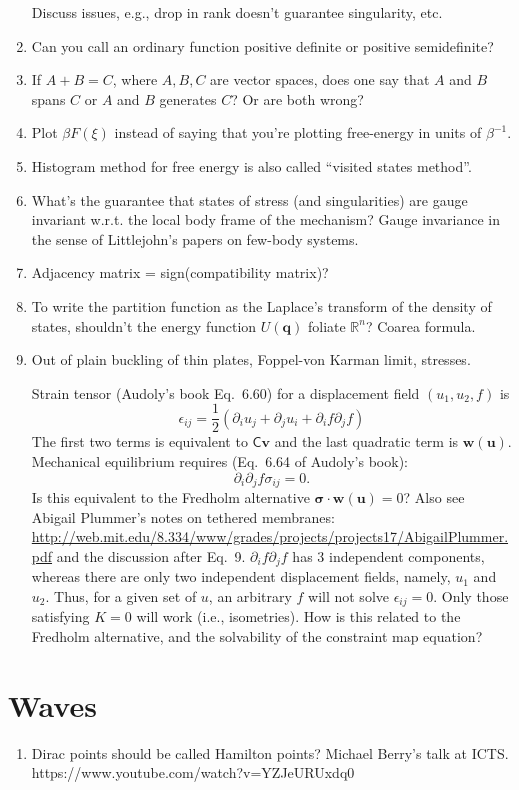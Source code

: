 \begin{enumerate}
  Discuss issues, e.g., drop in rank doesn't guarantee singularity, etc.
  \item Can you call an ordinary function positive definite or positive semidefinite?
  \item If $A + B = C$, where $A, B, C$ are vector spaces, does one say that $A$ and $B$ spans $C$ or $A$ and $B$ generates $C$?  Or are both wrong?
  \item Plot $\beta F(\xi)$ instead of saying that you're plotting free-energy in units of $\beta^{-1}$.
  \item Histogram method for free energy is also called ``visited states method''.
  \item What's the guarantee that states of stress (and singularities) are gauge invariant w.r.t. the local body frame of the mechanism?
    Gauge invariance in the sense of Littlejohn's papers on few-body systems.
  \item Adjacency matrix = sign(compatibility matrix)?
  \item To write the partition function as the Laplace's transform of the density of states, shouldn't the energy function $U(\bm{q})$ foliate $\mathbb{R}^{n}$? Coarea formula.

  \item Out of plain buckling of thin plates, Foppel-von Karman limit, stresses.

    Strain tensor (Audoly's book Eq.~6.60) for a displacement field $(u_{1}, u_{2}, f)$ is
    \begin{equation}
      \epsilon_{ij} = \frac{1}{2}\left(\partial_{i} u_{j} + \partial_{j} u_{i} + \partial_{i}f \partial_{j}f\right)
    \end{equation}
    The first two terms is equivalent to $\mathsf{C}\bm{v}$ and the last quadratic term is $\bm{w}(\bm{u})$.
    Mechanical equilibrium requires (Eq.~6.64 of Audoly's book):
    \begin{equation}
      \partial_{i}\partial_{j} f \sigma_{ij} = 0.
    \end{equation}
    Is this equivalent to the Fredholm alternative $\bm{\sigma}\cdot\bm{w}(\bm{u}) = 0$?
    Also see Abigail Plummer's notes on tethered membranes: \url{http://web.mit.edu/8.334/www/grades/projects/projects17/AbigailPlummer.pdf} and the discussion after Eq.~9.  $\partial_{i}f \partial_{j} f$ has 3 independent components, whereas there are only two independent displacement fields, namely, $u_{1}$ and $u_{2}$.  Thus, for a given set of $u$, an arbitrary $f$ will not solve $\epsilon_{ij} = 0$.  Only those satisfying $K = 0$ will work (i.e., isometries).
    How is this related to the Fredholm alternative, and the solvability of the constraint map equation?

\end{enumerate}

\section{Waves}

\begin{enumerate}
  \item Dirac points should be called Hamilton points? Michael Berry's talk at ICTS. https://www.youtube.com/watch?v=YZJeURUxdq0
\end{enumerate}
